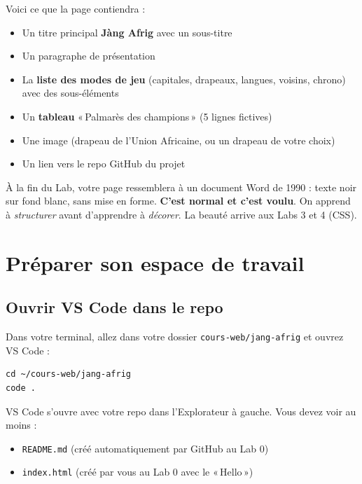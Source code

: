 \documentclass[11pt,a4paper]{article}
\begin{document}
Voici ce que la page contiendra :

\begin{itemize}[nosep]
    \item Un titre principal \textbf{Jàng Afrig} avec un sous-titre
    \item Un paragraphe de présentation
    \item La \textbf{liste des modes de jeu} (capitales, drapeaux, langues, voisins, chrono) avec des sous-éléments
    \item Un \textbf{tableau} «\,Palmarès des champions\,» (5 lignes fictives)
    \item Une image (drapeau de l'Union Africaine, ou un drapeau de votre choix)
    \item Un lien vers le repo GitHub du projet
\end{itemize}

\begin{retenirbox}
À la fin du Lab, votre page ressemblera à un document Word de 1990 :
texte noir sur fond blanc, sans mise en forme. \textbf{C'est normal et
c'est voulu}. On apprend à \emph{structurer} avant d'apprendre à
\emph{décorer}. La beauté arrive aux Labs 3 et 4 (CSS).
\end{retenirbox}

\newpage

\section{Préparer son espace de travail}

\subsection{Ouvrir VS Code dans le repo}

Dans votre terminal, allez dans votre dossier \texttt{cours-web/jang-afrig}
et ouvrez VS Code :

\begin{lstlisting}
cd ~/cours-web/jang-afrig
code .
\end{lstlisting}

VS Code s'ouvre avec votre repo dans l'Explorateur à gauche. Vous devez
voir au moins :
\begin{itemize}[nosep]
    \item \texttt{README.md} (créé automatiquement par GitHub au Lab 0)
    \item \texttt{index.html} (créé par vous au Lab 0 avec le «\,Hello\,»)
\end{itemize}
\end{document}
